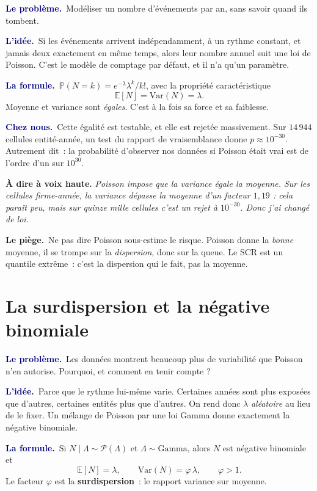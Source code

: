 \documentclass[11pt,a4paper]{article}
\newcommand{\lequoi}[1]{\smallskip\noindent\textcolor{navy}{\textbf{Le problème.}}\ #1\par}
\newcommand{\lidee}[1]{\smallskip\noindent\textcolor{navy}{\textbf{L'idée.}}\ #1\par}
\newcommand{\laformule}[1]{\smallskip\noindent\textcolor{navy}{\textbf{La formule.}}\ #1\par}
\newcommand{\cheznous}[1]{\smallskip\noindent\textcolor{navy}{\textbf{Chez nous.}}\ #1\par}
\newcommand{\lepiege}[1]{\smallskip\noindent\textcolor{accent}{\textbf{Le piège.}}\ #1\par}
\newcommand{\laphrase}[1]{\begin{phrasebox}\textbf{À dire à voix haute.} \emph{#1}\end{phrasebox}}
\begin{document}
\lequoi{Modéliser un nombre d'événements par an, sans savoir quand ils tombent.}

\lidee{Si les événements arrivent indépendamment, à un rythme constant, et jamais deux
exactement en même temps, alors leur nombre annuel suit une loi de Poisson. C'est le modèle
de comptage par défaut, et il n'a qu'un paramètre.}

\laformule{$\mathbb{P}(N=k)=e^{-\lambda}\lambda^k/k!$, avec la propriété caractéristique
\[
  \mathbb{E}[N]=\mathrm{Var}(N)=\lambda .
\]
Moyenne et variance sont \emph{égales}. C'est à la fois sa force et sa faiblesse.}

\cheznous{Cette égalité est testable, et elle est rejetée massivement. Sur $14\,944$
cellules entité-année, un test du rapport de vraisemblance donne $p\approx10^{-30}$.
Autrement dit~: la probabilité d'observer nos données si Poisson était vrai est de l'ordre
d'un sur $10^{30}$.}

\laphrase{Poisson impose que la variance égale la moyenne. Sur les cellules firme-année, la
variance dépasse la moyenne d'un facteur $1{,}19$ : cela paraît peu, mais sur quinze mille
cellules c'est un rejet à $10^{-30}$. Donc j'ai changé de loi.}

\lepiege{Ne pas dire \og Poisson sous-estime le risque\fg{}. Poisson donne la \emph{bonne}
moyenne, il se trompe sur la \emph{dispersion}, donc sur la queue. Le SCR est un quantile
extrême~: c'est la dispersion qui le fait, pas la moyenne.}

\section{La surdispersion et la négative binomiale}

\lequoi{Les données montrent beaucoup plus de variabilité que Poisson n'en autorise. Pourquoi,
et comment en tenir compte ?}

\lidee{Parce que le rythme lui-même varie. Certaines années sont plus exposées que
d'autres, certaines entités plus que d'autres. On rend donc $\lambda$ \emph{aléatoire} au
lieu de le fixer. Un mélange de Poisson par une loi Gamma donne exactement la négative
binomiale.}

\laformule{Si $N\mid\Lambda\sim\mathcal{P}(\Lambda)$ et $\Lambda\sim\mathrm{Gamma}$, alors
$N$ est négative binomiale et
\[
  \mathbb{E}[N]=\lambda, \qquad \mathrm{Var}(N)=\varphi\,\lambda, \qquad \varphi>1 .
\]
Le facteur $\varphi$ est la \textbf{surdispersion}~: le rapport variance sur moyenne.}
\end{document}
